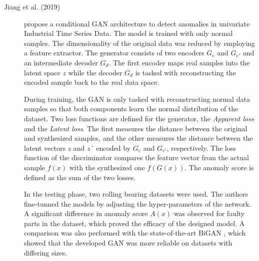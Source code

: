 \begin{description}
    \item[Jiang et al. (2019) \cite{jiang.etal_GANBasedAnomalyDetection_2019}] propose a conditional GAN architecture to detect anomalies in univariate Industrial Time Series Data. The model is trained with only normal samples. The dimensionality of the original data was reduced by employing a feature extractor. The generator consists of two encoders $G_e$ and $G_{e'}$ and an intermediate decoder $G_d$. The first encoder maps real samples into the latent space $z$ while the decoder $G_d$ is tasked with reconstructing the encoded sample back to the real data space. 
    
    During training, the GAN is only tasked with reconstructing normal data samples so that both components learn the normal distribution of the dataset. Two loss functions are defined for the generator, the \textit{Apparent loss} and the \textit{Latent loss}. The first measures the distance between the original and synthesized samples, and the other measures the distance between the latent vectors $z$ and $z´$ encoded by $G_e$ and $G_{e'}$, respectively. The loss function of the discriminator compares the feature vector from the actual sample $f(x)$ with the synthesized one $f(G(x))$. The anomaly score is defined as the sum of the two losses. 

In the testing phase, two rolling bearing datasets were used. The authors fine-tunned the models by adjusting the hyper-parameters of the network. A significant difference in anomaly score $A(x)$ was observed for faulty parts in the dataset, which proved the efficacy of the designed model. A comparison was also performed with the state-of-the-art BiGAN \cite{donahue.etal_AdversarialFeatureLearning_2017}, which showed that the developed GAN was more reliable on datasets with differing sizes.
\end{description}

